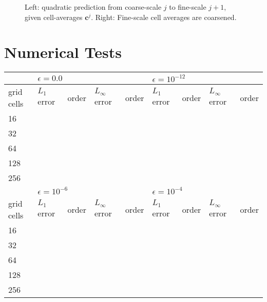 \documentclass{article}
\begin{document}
\begin{figure}
    \centering
    
    \caption{Left: quadratic prediction from coarse-scale $j$
        to fine-scale $j+1$, given cell-averages $\mathbf{c}^{j}$.
        Right: Fine-scale cell averages are coarsened.}
\end{figure}

\section{Numerical Tests}
\begin{center}\vspace{1cm}
\begin{tabular}{|l|l|l|l|l|l|l|l|l|}
\hline
           & \multicolumn{4}{l|}{$\epsilon = 0.0$}              & \multicolumn{4}{l|}{$\epsilon = 10^{-12}$}         \\ \hline
grid cells & $L_{1}$ error & order & $L_{\infty}$ error & order & $L_{1}$ error & order & $L_{\infty}$ error & order \\ \hline
16         &               &       &                    &       &               &       &                    &       \\ \hline
32         &               &       &                    &       &               &       &                    &       \\ \hline
64         &               &       &                    &       &               &       &                    &       \\ \hline
128        &               &       &                    &       &               &       &                    &       \\ \hline
256        &               &       &                    &       &               &       &                    &       \\ \hline
           & \multicolumn{4}{l|}{$\epsilon = 10^{-6}$}          & \multicolumn{4}{l|}{$\epsilon = 10^{-4}$}          \\ \hline
grid cells & $L_{1}$ error & order & $L_{\infty}$ error & order & $L_{1}$ error & order & $L_{\infty}$ error & order \\ \hline
16         &               &       &                    &       &               &       &                    &       \\ \hline
32         &               &       &                    &       &               &       &                    &       \\ \hline
64         &               &       &                    &       &               &       &                    &       \\ \hline
128        &               &       &                    &       &               &       &                    &       \\ \hline
256        &               &       &                    &       &               &       &                    &       \\ \hline
\end{tabular}
\end{center}\vspace{1cm}
\end{document}
